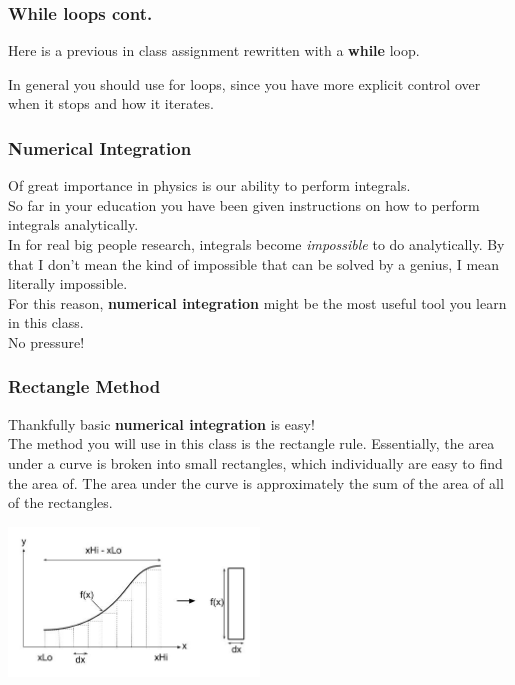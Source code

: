 \documentclass{beamer}
\begin{document}
\begin{frame}
  \frametitle{While loops cont.}
  Here is a previous in class assignment
  rewritten with a \textbf{while} loop.
  
  In general you should use for loops, since you have more
  explicit control over when it stops and how it iterates.
\end{frame}

\begin{frame}
  \frametitle{Numerical Integration}
  Of great importance in physics is our ability to perform integrals.\\
  So far in your education you have been given instructions on how
  to perform integrals analytically.\\
  \vspace{12pt}
  In for real big people research, integrals become \textit{impossible}
  to do analytically. By that I don't mean the kind of impossible 
  that can be solved by a genius, I mean literally impossible.\\
  \vspace{12pt}
  For this reason, \textbf{numerical integration} might be the 
  most useful tool you learn in this class.\\
  \vspace{12pt}
  No pressure!
\end{frame}

\begin{frame}
  \frametitle{Rectangle Method}
  Thankfully basic \textbf{numerical integration} is easy!\\
  The method you will use in this class is the rectangle rule.
  Essentially, the area under a curve is broken into small rectangles,
  which individually are easy to find the area of.
  The area under the curve is approximately the sum of the area of
  all of the rectangles.
  \begin{center}
    \includegraphics[width=0.5\textwidth]{rectanglemethod.jpg}
  \end{center}
\end{frame}
\end{document}
